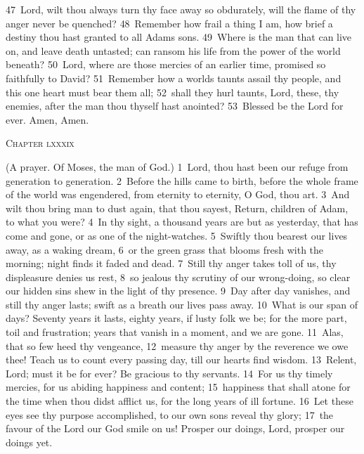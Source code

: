 \documentclass[10pt]{book} %
\begin{document}
\textcolor{benred8}{47}~Lord, wilt thou always turn thy face away so obdurately, will the flame of thy anger never be quenched? \textcolor{benred8}{48}~Remember how frail a thing I am, how brief a destiny thou hast granted to all Adam\textquotesingle s sons. \textcolor{benred8}{49}~Where is the man that can live on, and leave death untasted; can ransom his life from the power of the world beneath? \textcolor{benred8}{50}~Lord, where are those mercies of an earlier time, promised so faithfully to David? \textcolor{benred8}{51}~Remember how a world\textquotesingle s taunts assail thy people, and this one heart must bear them all; \textcolor{benred8}{52}~shall they hurl taunts, Lord, these, thy enemies, after the man thou thyself hast anointed?
\textcolor{benred8}{53}~Blessed be the Lord for ever. Amen, Amen.
\begin{large}\begin{center}\textsc{Chapter lxxxix}\end{center}\end{large}
(A prayer. Of Moses, the man of God.)
\textcolor{benred8}{1}~Lord, thou hast been our refuge from generation to generation. \textcolor{benred8}{2}~Before the hills came to birth, before the whole frame of the world was engendered, from eternity to eternity, O God, thou art. \textcolor{benred8}{3}~And wilt thou bring man to dust again, that thou sayest, Return, children of Adam, to what you were? \textcolor{benred8}{4}~In thy sight, a thousand years are but as yesterday, that has come and gone, or as one of the night-watches. \textcolor{benred8}{5}~Swiftly thou bearest our lives away, as a waking dream, \textcolor{benred8}{6}~or the green grass that blooms fresh with the morning; night finds it faded and dead. \textcolor{benred8}{7}~Still thy anger takes toll of us, thy displeasure denies us rest, \textcolor{benred8}{8}~so jealous thy scrutiny of our wrong-doing, so clear our hidden sins shew in the light of thy presence. \textcolor{benred8}{9}~Day after day vanishes, and still thy anger lasts; swift as a breath our lives pass away. \textcolor{benred8}{10}~What is our span of days? Seventy years it lasts, eighty years, if lusty folk we be; for the more part, toil and frustration; years that vanish in a moment, and we are gone. \textcolor{benred8}{11}~Alas, that so few heed thy vengeance, \textcolor{benred8}{12}~measure thy anger by the reverence we owe thee! Teach us to count every passing day, till our hearts find wisdom.
\textcolor{benred8}{13}~Relent, Lord; must it be for ever? Be gracious to thy servants. \textcolor{benred8}{14}~For us thy timely mercies, for us abiding happiness and content; \textcolor{benred8}{15}~happiness that shall atone for the time when thou didst afflict us, for the long years of ill fortune. \textcolor{benred8}{16}~Let these eyes see thy purpose accomplished, to our own sons reveal thy glory; \textcolor{benred8}{17}~the favour of the Lord our God smile on us! Prosper our doings, Lord, prosper our doings yet.
\end{document}
